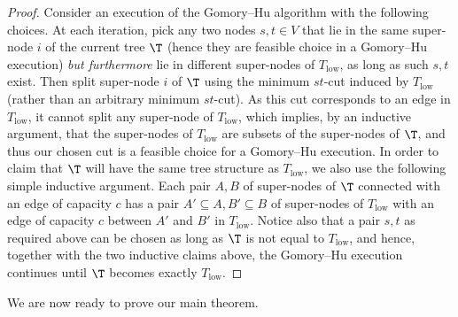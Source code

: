 \begin{proof}
  Consider an execution of the Gomory--Hu algorithm with the following choices.
  At each iteration, pick any two nodes $s,t\in V$
  that lie in the same super-node $i$ of the current tree $\T$
  (hence they are feasible choice in a Gomory--Hu execution)
  \emph{but furthermore} lie in different super-nodes of $T_{\mathrm{low}}$,
  as long as such $s,t$ exist.
  Then split super-node $i$ of $\T$ using the minimum $st$-cut induced by $T_{\mathrm{low}}$ (rather than an arbitrary minimum $st$-cut).
  As this cut corresponds to an edge in $T_{\mathrm{low}}$,
  it cannot split any super-node of $T_{\mathrm{low}}$,
  which implies, by an inductive argument,
  that the super-nodes of $T_{\mathrm{low}}$ are subsets of the super-nodes of $\T$,
  and thus our chosen cut is a feasible choice for a Gomory--Hu execution.
In order to claim that $\T$ will have the same tree structure as $T_{\mathrm{low}}$, we also use the following simple inductive argument.
Each pair $A,B$ of super-nodes of $\T$ connected with an edge of capacity $c$ has a pair $A'\subseteq A, B'\subseteq B$ of super-nodes of $T_{\mathrm{low}}$ with an edge of capacity $c$
%
between
$A'$ and $B'$ in $T_{\mathrm{low}}$.
  Notice also that a pair $s,t$ as required above can be chosen
  as long as $\T$ is not equal to $T_{\mathrm{low}}$, and hence, together with the two inductive claims above,
  the Gomory--Hu execution continues until $\T$ becomes exactly $T_{\mathrm{low}}$.
\end{proof}


\medskip
We are now ready to prove our main theorem.

